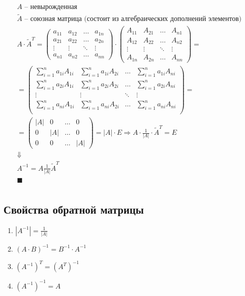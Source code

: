 \documentclass[12pt, fleqn]{article}
\begin{document}
\begin{multline*}
	A \text{ -- невырожденная}\\
	\tilde{A} \text{ -- союзная матрица (состоит из алгебраических дополнений элементов)}\\
	A\cdot \tilde{A}^T = \left(
	\begin{array}{cccc}
		a_{11} & a_{12} & \ldots & a_{1n}\\
		a_{21} & a_{22} & \ldots & a_{2n}\\
		\vdots & \vdots & \ddots & \vdots\\
		a_{n1} & a_{n2} & \ldots & a_{nn}
	\end{array}\right)
	\cdot\left(
	\begin{array}{cccc}
	A_{11} & A_{21} & \ldots & A_{n1}\\
	A_{12} & A_{22} & \ldots & A_{n2}\\
	\vdots & \vdots & \ddots & \vdots\\
	A_{1n} & A_{2n} & \ldots & A_{nn}
	\end{array}
	\right)=\\
	=\left(
	\begin{array}{cccc}
		\sum_{i=1}^{n} a_{1i}A_{1i} & \sum_{i=1}^{n}a_{1i}A_{2i} & \ldots & \sum_{i=1}^{n}a_{1i}A_{ni}\\
		\sum_{i=1}^{n}a_{2i}A_{1i} & \sum_{i=1}^{n}a_{2i}A_{2i} & \ldots & \sum_{i=1}^{n}a_{2i}A_{ni}\\
		\vdots & \vdots & \ddots & \vdots\\
		\sum_{i=1}^{n}a_{ni}A_{1i} & \sum_{i=1}^{n}a_{ni}A_{2i} & \ldots & \sum_{i=1}^{n}a_{ni}A_{ni}\\
	\end{array}\right)=\\
	=\left(\begin{matrix}
		|A|&0&\ldots&0\\
		0&|A|&\ldots&0\\
		0&0&\ldots&|A|
	\end{matrix}\right) = |A|\cdot E\Rightarrow A\cdot \frac{1}{|A|}\cdot \tilde{A}^T=E\\
	\Downarrow\\
	A^{-1}=A\frac{1}{|A|}\tilde{A}^T\\
	\blacksquare\\
\end{multline*}
\subsection*{Свойства обратной матрицы}
\begin{enumerate}
	\item $\left|A^{-1}\right| = \frac{1}{|A|}$
	\item $\left(A\cdot B\right)^{-1} = B^{-1}\cdot A^{-1}$
	\item $\left(A^{-1}\right)^T=\left(A^T\right)^{-1}$
	\item $\left(A^{-1}\right)^{-1}=A$
\end{enumerate}
\end{document}
